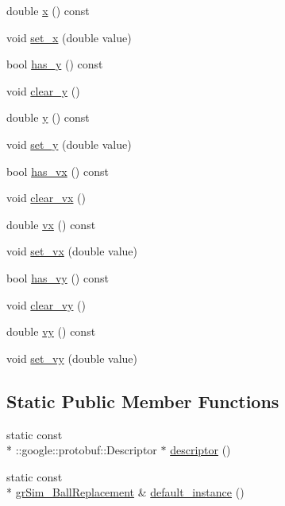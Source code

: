 \begin{DoxyCompactItemize}
\item 
double \hyperlink{classgr_sim___ball_replacement_ac737c3227ef941b1ff83e7421d8a2225}{x} () const 
\item 
void \hyperlink{classgr_sim___ball_replacement_a9839e10674164d52eaeaf6a312630c1c}{set\-\_\-x} (double value)
\item 
bool \hyperlink{classgr_sim___ball_replacement_a1ed78699ee35336421e7b3258ca4f7ae}{has\-\_\-y} () const 
\item 
void \hyperlink{classgr_sim___ball_replacement_afc1a124e6e4645639f287b245a75d356}{clear\-\_\-y} ()
\item 
double \hyperlink{classgr_sim___ball_replacement_a633edf51addb9df3a8339739337f852b}{y} () const 
\item 
void \hyperlink{classgr_sim___ball_replacement_a7459a89a52ef712fb33d37b2b0de416d}{set\-\_\-y} (double value)
\item 
bool \hyperlink{classgr_sim___ball_replacement_aaca81bb1d4cc555efcd082f38ec44c2e}{has\-\_\-vx} () const 
\item 
void \hyperlink{classgr_sim___ball_replacement_aea22c7108dcf8964fb83ffb9bc9ffccb}{clear\-\_\-vx} ()
\item 
double \hyperlink{classgr_sim___ball_replacement_a82ae711ded3cd158d6c478bb927d75e1}{vx} () const 
\item 
void \hyperlink{classgr_sim___ball_replacement_a4ca580c591761b4f940ed34713e43b4c}{set\-\_\-vx} (double value)
\item 
bool \hyperlink{classgr_sim___ball_replacement_a5da0c073a501b6860a3aa7e84cbcc31b}{has\-\_\-vy} () const 
\item 
void \hyperlink{classgr_sim___ball_replacement_aaf8c4cb15b3209451c9418c3109d4af9}{clear\-\_\-vy} ()
\item 
double \hyperlink{classgr_sim___ball_replacement_a4c40917663db2d40b5871831bed8cfd7}{vy} () const 
\item 
void \hyperlink{classgr_sim___ball_replacement_adc9e69bacd572e1556401c4284b0fc4b}{set\-\_\-vy} (double value)
\end{DoxyCompactItemize}
\subsection*{Static Public Member Functions}
\begin{DoxyCompactItemize}
\item 
static const \\*
\-::google\-::protobuf\-::\-Descriptor $\ast$ \hyperlink{classgr_sim___ball_replacement_aba116777746cfd96f5815f382e167991}{descriptor} ()
\item 
static const \\*
\hyperlink{classgr_sim___ball_replacement}{gr\-Sim\-\_\-\-Ball\-Replacement} \& \hyperlink{classgr_sim___ball_replacement_ad716936d6e8fd5949dc3390a49186dd3}{default\-\_\-instance} ()
\end{DoxyCompactItemize}
